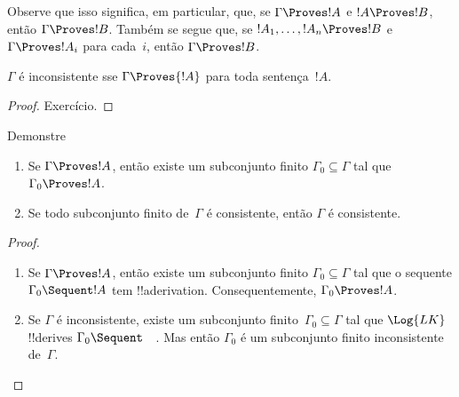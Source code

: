 \documentclass[../../../include/open-logic-section]{subfiles}
\begin{document}
Observe que isso significa, em particular, que, se $\Gamma \Proves
!A$ e $!A \Proves !B$, então $\Gamma \Proves !B$. Também se segue
que, se $!A_1, \dots, !A_n \Proves !B$ e $\Gamma \Proves !A_i$ para
cada~$i$, então $\Gamma \Proves !B$.

\begin{prop}
$\Gamma$ é inconsistente sse $\Gamma \Proves {!A}$ para toda
  sentença~$!A$.
\end{prop}

\begin{proof}
Exercício.
\end{proof}

\begin{prob}
Demonstre 
\end{prob}

\begin{prop}[Compacidade]
  \begin{enumerate}
  \item Se $\Gamma \Proves !A$, então existe um subconjunto finito
    $\Gamma_0 \subseteq \Gamma$ tal que $\Gamma_0 \Proves !A$.
  \item Se todo subconjunto finito de~$\Gamma$ é consistente, então
    $\Gamma$ é consistente.
  \end{enumerate}
\end{prop}

\begin{proof}
  \begin{enumerate}
    \item Se $\Gamma \Proves !A$, então existe um subconjunto finito
      $\Gamma_0 \subseteq \Gamma$ tal que o sequente $\Gamma_0
      \Sequent !A$ tem !!a{derivation}. Consequentemente, $\Gamma_0
      \Proves !A$.
    \item Se $\Gamma$ é inconsistente, existe um subconjunto
      finito~$\Gamma_0 \subseteq \Gamma$ tal que $\Log{LK}$
      !!{derive}s $\Gamma_0 \Sequent \quad$. Mas então $\Gamma_0$ é um
      subconjunto finito inconsistente de~$\Gamma$.
  \end{enumerate}
\end{proof}
\end{document}
